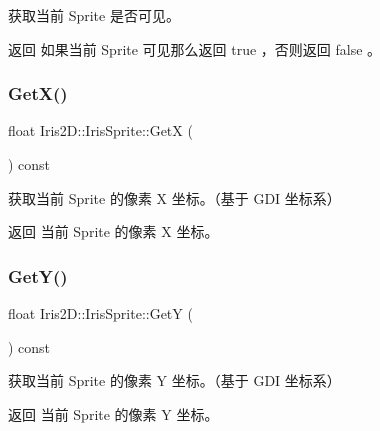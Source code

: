 获取当前 Sprite 是否可见。 

\begin{DoxyReturn}{返回}
如果当前 Sprite 可见那么返回 true ，否则返回 false 。 
\end{DoxyReturn}
\mbox{\label{class_iris2_d_1_1_iris_sprite_a6de92be964427290ad6daa0ee294cf21}} 
\subsubsection{\texorpdfstring{Get\+X()}{GetX()}}
{\footnotesize\ttfamily float Iris2\+D\+::\+Iris\+Sprite\+::\+GetX (\begin{DoxyParamCaption}{ }\end{DoxyParamCaption}) const}



获取当前 Sprite 的像素 X 坐标。（基于 G\+DI 坐标系） 

\begin{DoxyReturn}{返回}
当前 Sprite 的像素 X 坐标。 
\end{DoxyReturn}
\mbox{\label{class_iris2_d_1_1_iris_sprite_afe8423cb0d34987c87f020ba3ba34b67}} 
\subsubsection{\texorpdfstring{Get\+Y()}{GetY()}}
{\footnotesize\ttfamily float Iris2\+D\+::\+Iris\+Sprite\+::\+GetY (\begin{DoxyParamCaption}{ }\end{DoxyParamCaption}) const}



获取当前 Sprite 的像素 Y 坐标。（基于 G\+DI 坐标系） 

\begin{DoxyReturn}{返回}
当前 Sprite 的像素 Y 坐标。 
\end{DoxyReturn}
\mbox{\label{class_iris2_d_1_1_iris_sprite_ad4966003c9bf2ad093db013de626e44c}} 
